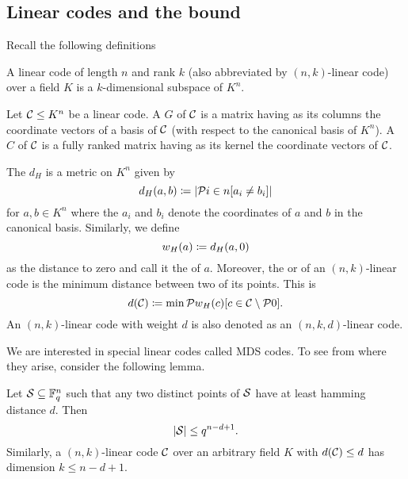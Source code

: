 \subsection{Linear codes and the  bound}

Recall the following definitions

\begin{definition}
    A linear code of length $n$ and rank $k$ (also abbreviated by $(n,k)$-linear code) over a field $K$ is a $k$-dimensional subspace of $K^n$.  
\end{definition}

\begin{definition}
    Let $\mathcal{C}\leq K^n$ be a linear code. A  $G$ of $\mathcal{C}$ is a matrix having as its columns the coordinate vectors of a basis of $\mathcal{C}$ (with respect to the canonical basis of $K^n$). A  $C$ of $\mathcal{C}$ is a fully ranked matrix having as its kernel the coordinate vectors of $\mathcal{C}$.
\end{definition}

\begin{definition}
    The  $d_H$ is a metric on $K^n$ given by
    $$
    d_H(a,b)\defeq\card{\set{i\in n}[a_i\neq b_i]}
    $$
    for $a,b\in K^n$ where the $a_i$ and $b_i$ denote the coordinates of $a$ and $b$ in the canonical basis.
    Similarly, we define
    $$
    w_H(a)\mathrel{\mathrel{\mathop:}\mkern-1.2mu=} d_H(a,0)
    $$
    as the  distance to zero and call it the  of $a$.
    Moreover, the  or  of an $(n,k)$-linear code is the minimum  distance between two of its points.
    This is
    $$
    d(\cC)\defeq \min\set{w_H(c)}[c\in\cC\setminus\set{0}].
    $$
    An $(n,k)$-linear code with  weight $d$ is also denoted as an $(n,k,d)$-linear code.
\end{definition}

We are interested in special linear codes called MDS codes. To see from where they arise, consider the following lemma.

\begin{lemma}
    Let $\mathcal{S}\subseteq \mathbb{F}_{q}^n$ such that any two distinct points of $\mathcal{S}$ have at least hamming distance $d$. Then
    $$
    \left|\mathcal{S}\right|\leq q^{n-d+1}.
    $$
    Similarly, a $(n,k)$-linear code $\mathcal{C}$ over an arbitrary field $K$ with $d(\mathcal{C})\leq d$ has dimension $k\leq n-d+1$.
\end{lemma}

